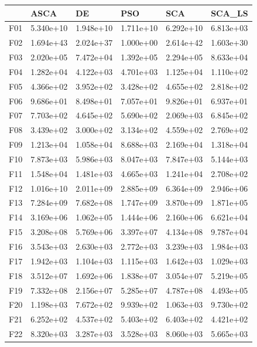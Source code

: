 \begin{tabular}{llllll}
\toprule
{} &       ASCA &         DE &        PSO &        SCA &     SCA\_LS \\
\midrule
F01  &  5.340e+10 &  1.948e+10 &  1.711e+10 &  6.292e+10 &  6.813e+03 \\
F02  &  1.694e+43 &  2.024e+37 &  1.000e+00 &  2.614e+42 &  1.603e+30 \\
F03  &  2.020e+05 &  7.472e+04 &  1.392e+05 &  2.294e+05 &  8.633e+04 \\
F04  &  1.282e+04 &  4.122e+03 &  4.701e+03 &  1.125e+04 &  1.110e+02 \\
F05  &  4.366e+02 &  3.952e+02 &  3.428e+02 &  4.655e+02 &  2.818e+02 \\
F06  &  9.686e+01 &  8.498e+01 &  7.057e+01 &  9.826e+01 &  6.937e+01 \\
F07  &  7.703e+02 &  4.645e+02 &  5.690e+02 &  2.069e+03 &  6.845e+02 \\
F08  &  3.439e+02 &  3.000e+02 &  3.134e+02 &  4.559e+02 &  2.769e+02 \\
F09  &  1.213e+04 &  1.058e+04 &  8.688e+03 &  2.169e+04 &  1.318e+04 \\
F10  &  7.873e+03 &  5.986e+03 &  8.047e+03 &  7.847e+03 &  5.144e+03 \\
F11  &  1.548e+04 &  1.481e+03 &  4.665e+03 &  1.241e+04 &  2.708e+02 \\
F12  &  1.016e+10 &  2.011e+09 &  2.885e+09 &  6.364e+09 &  2.946e+06 \\
F13  &  7.284e+09 &  7.682e+08 &  1.747e+09 &  3.870e+09 &  1.871e+05 \\
F14  &  3.169e+06 &  1.062e+05 &  1.444e+06 &  2.160e+06 &  6.621e+04 \\
F15  &  3.208e+08 &  5.769e+06 &  3.397e+07 &  4.134e+08 &  9.787e+04 \\
F16  &  3.543e+03 &  2.630e+03 &  2.772e+03 &  3.239e+03 &  1.984e+03 \\
F17  &  1.942e+03 &  1.104e+03 &  1.115e+03 &  1.642e+03 &  1.029e+03 \\
F18  &  3.512e+07 &  1.692e+06 &  1.838e+07 &  3.054e+07 &  5.219e+05 \\
F19  &  7.332e+08 &  2.156e+07 &  5.285e+07 &  4.787e+08 &  4.493e+05 \\
F20  &  1.198e+03 &  7.672e+02 &  9.939e+02 &  1.063e+03 &  9.730e+02 \\
F21  &  6.252e+02 &  4.537e+02 &  5.403e+02 &  6.403e+02 &  4.421e+02 \\
F22  &  8.320e+03 &  3.287e+03 &  3.528e+03 &  8.060e+03 &  5.665e+03 \\

\end{tabular}
